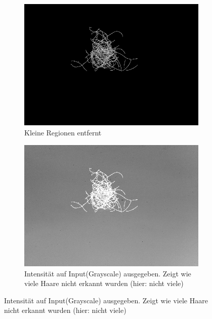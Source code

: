 \documentclass[german,a4paper, 12pt]{llncs}
\begin{document}
\begin{figure}[H] %
	\begin{subfigure}{0.48\textwidth}
		\includegraphics[width=\linewidth]{figBina/06small regions removed.png}
		\caption{Kleine Regionen entfernt} \label{fig:a}
	\end{subfigure}\hspace*{\fill}
	\begin{subfigure}{0.48\textwidth}
		\includegraphics[width=\linewidth]{figBina/07missed hair.png}
		\caption{Intensität auf Input(Grayscale) ausgegeben. Zeigt wie viele Haare nicht erkannt wurden (hier: nicht viele)} \label{fig:b}
	\end{subfigure}
	

\end{figure}
\end{document}
